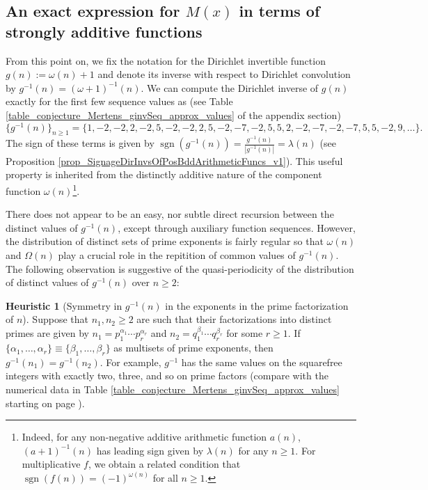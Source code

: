 \documentclass[11pt,reqno,a4letter]{article}
\numberwithin{figure}{section}
\numberwithin{table}{section}
\theoremstyle{plain}
\numberwithin{theorem}{section}
\theoremstyle{definition}
\newtheorem{heuristic}[theorem]{Heuristic}
\begin{document}
\subsection{An exact expression for $M(x)$ in terms of strongly additive functions} 
\label{example_InvertingARecRelForMx_Intro}

From this point on, we fix the notation for the Dirichlet invertible function $g(n) := \omega(n) + 1$ and denote its 
inverse with respect to Dirichlet convolution by $g^{-1}(n) = (\omega+1)^{-1}(n)$. 
We can compute the
Dirichlet inverse of $g(n)$ exactly for the first few sequence values as 
(see Table \ref{table_conjecture_Mertens_ginvSeq_approx_values} of the appendix section) 
\[
\{g^{-1}(n)\}_{n \geq 1} = \{1, -2, -2, 2, -2, 5, -2, -2, 2, 5, -2, -7, -2, 5, 5, 2, -2, -7, -2, 
     -7, 5, 5, -2, 9, \ldots \}. 
\] 
The sign of these terms is given by $\operatorname{sgn}(g^{-1}(n)) = \frac{g^{-1}(n)}{|g^{-1}(n)|} = \lambda(n)$ 
(see Proposition \ref{prop_SignageDirInvsOfPosBddArithmeticFuncs_v1}). 
This useful property is inherited from the distinctly 
additive nature of the component function $\omega(n)$\footnote{ 
     Indeed, for any non-negative additive arithmetic function $a(n)$, 
     $(a+1)^{-1}(n)$ has leading sign given by $\lambda(n)$ for any $n \geq 1$. 
     For multiplicative $f$, we obtain a related condition that 
     $\operatorname{sgn}(f(n)) = (-1)^{\omega(n)}$ for all $n \geq 1$. 
}. 

There does not appear to be an easy, nor subtle 
direct recursion between the distinct values of $g^{-1}(n)$, except through auxiliary function sequences. 
However, the distribution of distinct sets of prime exponents is fairly regular so that 
$\omega(n)$ and $\Omega(n)$ play a crucial role in the repitition of common values of 
$g^{-1}(n)$. 
The following observation is suggestive of the quasi-periodicity of the distribution of 
distinct values of $g^{-1}(n)$ over $n \geq 2$: 

\begin{heuristic}[Symmetry in $g^{-1}(n)$ in the exponents in the prime factorization of $n$] 
Suppose that $n_1, n_2 \geq 2$ are such that their factorizations into distinct primes are 
given by $n_1 = p_1^{\alpha_1} \cdots p_r^{\alpha_r}$ and $n_2 = q_1^{\beta_1} \cdots q_r^{\beta_r}$ 
for some $r \geq 1$. 
If $\{\alpha_1, \ldots, \alpha_r\} \equiv \{\beta_1, \ldots, \beta_r\}$ as multisets of prime exponents, 
then $g^{-1}(n_1) = g^{-1}(n_2)$. For example, $g^{-1}$ has the same values on the squarefree integers 
with exactly two, three, and so on prime factors 
(compare with the numerical data in Table \ref{table_conjecture_Mertens_ginvSeq_approx_values} starting on page 
\pageref{table_conjecture_Mertens_ginvSeq_approx_values}). 
\end{heuristic} 
\end{document}
